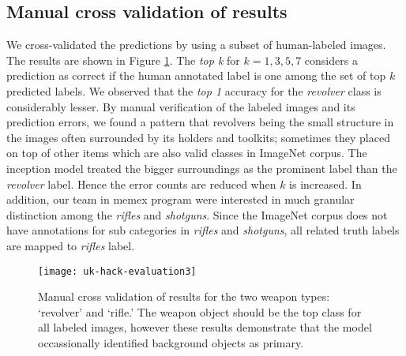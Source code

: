 \subsection{Manual cross validation of results}
We cross-validated the predictions by using a subset of human-labeled images. The results are shown in Figure \ref{fig:uk-hack-eval}. The \textit{top k} for $k=1,3,5,7$ considers a prediction as correct if the human annotated label is one among the set of top $k$  predicted labels. We observed that the \textit{top 1} accuracy for the \textit{revolver} class is considerably lesser. By manual verification of the labeled images and its prediction errors, we found a pattern that revolvers being the small structure in the images often surrounded by its holders and toolkits; sometimes they placed on top of other items which are also valid classes in ImageNet corpus. The inception model treated the bigger surroundings as the prominent label than the \textit{revolver} label. Hence the error counts are reduced when $k$ is increased. In addition, our team in memex program were interested in much granular distinction among the \textit{rifles} and \textit{shotguns}. Since the ImageNet corpus does not have annotations for sub categories in \textit{rifles} and \textit{shotguns}, all related truth labels are mapped to \textit{rifles} label. 

\begin{figure}[h]
	\texttt{[image: uk-hack-evaluation3]}
	\caption{Manual cross validation of results for the two weapon types: `revolver' and `rifle.' The weapon object should be the top class for all labeled images, however these results demonstrate that the model occassionally identified background objects as primary.}
	\label{fig:uk-hack-eval}
\end{figure}

